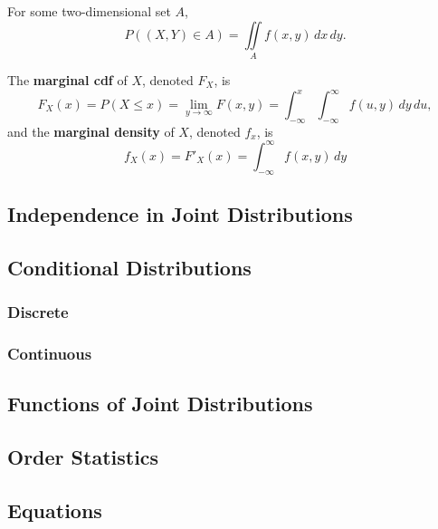 \documentclass[a4paper,10pt]{article}
\begin{document}
For some two-dimensional set $A$, 
\begin{equation*}
    P((X, Y) \in A) = \iint \limits_A f(x, y) \,dx\,dy.
\end{equation*}

The \textbf{marginal cdf} of $X$, denoted $F_X$, is 
\begin{equation*}
    F_X(x) = P(X\leq x) = \lim_{y\to\infty}F(x, y) = \int_{-\infty}^x \int_{-\infty}^{\infty}f(u, y)\,dy\,du,
\end{equation*}
and the \textbf{marginal density} of $X$, denoted $f_x$, is 
\begin{equation*}
    f_X(x) = F'_X(x) = \int_{-\infty}^{\infty}f(x, y)\,dy 
\end{equation*}


\subsection{Independence in Joint Distributions}

\subsection{Conditional Distributions}
\subsubsection{Discrete}
\subsubsection{Continuous}

\subsection{Functions of Joint Distributions}

\subsection{Order Statistics}

\subsection{Equations}
\end{document}
